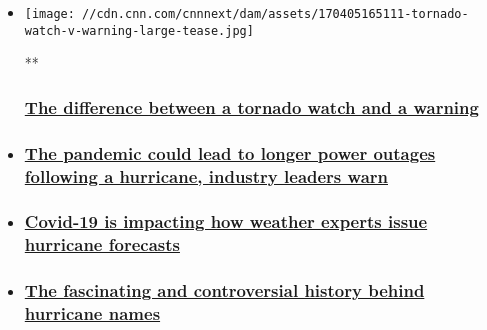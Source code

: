\begin{itemize}
\item
  \href{/videos/weather/2017/04/05/what-is-tornado-watch-warning-jpm-orig-mobile.cnn}{}

  \texttt{[image: //cdn.cnn.com/cnnnext/dam/assets/170405165111-tornado-watch-v-warning-large-tease.jpg]}

  **

  \hypertarget{the-difference-between-a-tornado-watch-and-a-warning}{%
  \subsubsection{\texorpdfstring{\href{/videos/weather/2017/04/05/what-is-tornado-watch-warning-jpm-orig-mobile.cnn}{The
  difference between a tornado watch and a
  warning}}{The difference between a tornado watch and a warning}}\label{the-difference-between-a-tornado-watch-and-a-warning}}
\item
  \hypertarget{the-pandemic-could-lead-to-longer-power-outages-following-a-hurricane-industry-leaders-warn}{%
  \subsubsection{\texorpdfstring{\href{/2020/06/28/weather/hurricane-season-florida-coronavirus-power-companies/index.html}{The
  pandemic could lead to longer power outages following a hurricane,
  industry leaders
  warn}}{The pandemic could lead to longer power outages following a hurricane, industry leaders warn}}\label{the-pandemic-could-lead-to-longer-power-outages-following-a-hurricane-industry-leaders-warn}}
\item
  \hypertarget{covid-19-is-impacting-how-weather-experts-issue-hurricane-forecasts}{%
  \subsubsection{\texorpdfstring{\href{/2020/07/25/weather/covid-hurricane-impacts-nws-employees/index.html}{Covid-19
  is impacting how weather experts issue hurricane
  forecasts}}{Covid-19 is impacting how weather experts issue hurricane forecasts}}\label{covid-19-is-impacting-how-weather-experts-issue-hurricane-forecasts}}
\item
  \hypertarget{the-fascinating-and-controversial-history-behind-hurricane-names}{%
  \subsubsection{\texorpdfstring{\href{/2020/08/01/weather/hurricane-names-history/index.html}{The
  fascinating and controversial history behind hurricane
  names}}{The fascinating and controversial history behind hurricane names}}\label{the-fascinating-and-controversial-history-behind-hurricane-names}}
\end{itemize}

